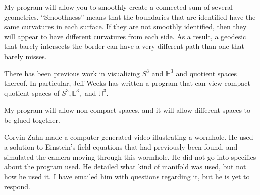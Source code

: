 \documentclass[12pt]{amsart}
\begin{document}
My program will allow you to smoothly create a connected sum of several geometries. ``Smoothness'' means that the boundaries that are identified have the same curvatures in each surface. If they are not smoothly identified, then they will appear to have different curvatures from each side. As a result, a geodesic that barely intersects the border can have a very different path than one that barely misses.





There has been previous work in visualizing $S^3$ and $\mathbb{H}^3$ and quotient spaces thereof. In particular, Jeff Weeks has written a program that can view compact quotient spaces of $S^3, \mathbb{E}^3,$ and $\mathbb{H}^3$. \cite{CurvedSpaces}

My program will allow non-compact spaces, and it will allow different spaces to be glued together.




Corvin Zahn made a computer generated video illustrating a wormhole. He used a solution to Einstein's field equations that had previously been found, and simulated the camera moving through this wormhole. He did not go into specifics about the program used. He detailed what kind of manifold was used, but not how he used it. I have emailed him with questions regarding it, but he is yet to respond. \cite{spacetimetravel}






\end{document}
